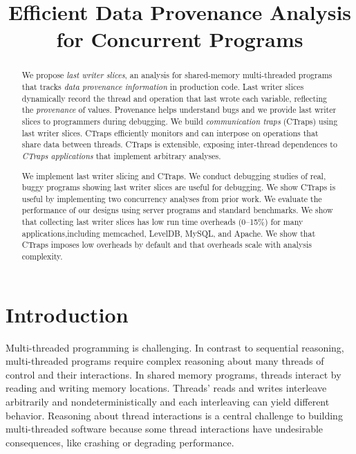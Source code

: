 \documentclass[preprint,9pt]{sigplanconf}
\title{Efficient Data Provenance Analysis for Concurrent Programs}
\newcommand{\ctraps}{CTraps\xspace}
\begin{document}
\maketitle

\begin{abstract}
We propose {\em last writer slices}, an analysis for shared-memory
multi-threaded programs that tracks {\em data provenance information} in
production code.  Last writer slices dynamically record the thread and
operation that last wrote each variable, reflecting the {\em provenance} of
values.  Provenance helps understand bugs and we provide last writer slices to
programmers during debugging.  We build {\em communication traps}
(\ctraps) using last writer slices.  \ctraps efficiently
monitors and can interpose on operations that share data between
threads.  \ctraps is extensible, exposing inter-thread dependences
to {\em \ctraps applications} that implement arbitrary analyses.  

We implement last writer slicing and \ctraps.  We conduct debugging studies of
real, buggy programs showing last writer slices are useful for debugging.  We
show \ctraps is useful by implementing two concurrency analyses from prior
work.  We evaluate the performance of our designs using server programs
and standard benchmarks.  We show that collecting last writer slices
has low run time overheads (0--15\%) for many applications,including  
memcached, LevelDB, MySQL, and Apache.  We show that \ctraps imposes low 
overheads by default and that overheads scale with analysis complexity.

\end{abstract}

\section{Introduction}
Multi-threaded programming is challenging.  In contrast to 
sequential reasoning, multi-threaded programs require complex reasoning about
many threads of control and their interactions.  In shared memory programs,
threads interact by reading and writing memory locations.  Threads' reads and
writes interleave arbitrarily and nondeterministically and each interleaving
can yield different behavior.  Reasoning about thread interactions is a central
challenge to building multi-threaded software because some thread interactions
have undesirable consequences, like crashing or degrading performance.
\end{document}
